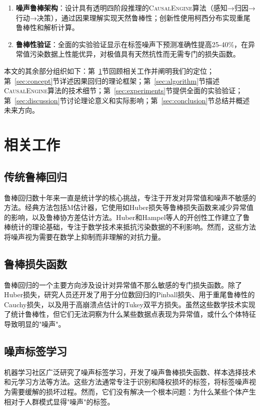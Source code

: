 \documentclass[conference]{IEEEtran}
\newcommand{\causalengine}{\textsc{CausalEngine}}
\begin{document}
\begin{CJK}{UTF8}{gbsn}
\begin{enumerate}
\item \textbf{噪声鲁棒架构}：设计具有透明四阶段推理的\causalengine{}算法（感知→归因→行动→决策），通过因果理解实现天然鲁棒性；创新性使用柯西分布实现重尾鲁棒性和解析计算。

\item \textbf{鲁棒性验证}：全面的实验验证显示在标签噪声下预测准确性提高25-40\%，在异常值污染数据上性能优异，对极值具有天然抗性而无需专门的损失函数。
\end{enumerate}

本文的其余部分组织如下：第~\ref{sec:related}节回顾相关工作并阐明我们的定位；第~\ref{sec:concept}节详述因果回归的理论框架；第~\ref{sec:algorithm}节描述\causalengine{}算法的技术细节；第~\ref{sec:experiments}节提供全面的实验验证；第~\ref{sec:discussion}节讨论理论意义和实际影响；第~\ref{sec:conclusion}节总结并概述未来方向。

\section{相关工作}
\label{sec:related}

\subsection{传统鲁棒回归}
鲁棒回归数十年来一直是统计学的核心挑战，专注于开发对异常值和噪声不敏感的方法。经典方法包括M估计器\cite{huber1964robust}，它使用如Huber损失等鲁棒损失函数来减少异常值的影响，以及鲁棒协方差估计方法\cite{rousseeuw1987robust}。Huber\cite{huber2009robust}和Hampel等人\cite{hampel1986robust}的开创性工作建立了鲁棒统计的理论基础，专注于数学技术来抵抗污染数据的不利影响。然而，这些方法将噪声视为需要在数学上抑制而非理解的对抗力量。

\subsection{鲁棒损失函数}
鲁棒回归的一个主要方向涉及设计对异常值不那么敏感的专门损失函数。除了Huber损失，研究人员还开发了用于分位数回归的Pinball损失\cite{koenker1978regression}、用于重尾鲁棒性的Cauchy损失，以及用于高崩溃点估计的Tukey双平方损失\cite{maronna2019robust}。虽然这些数学技术实现了统计鲁棒性，但它们无法洞察为什么某些数据点表现为异常值，或什么个体特征导致明显的"噪声"。

\subsection{噪声标签学习}
机器学习社区广泛研究了噪声标签学习\cite{natarajan2013learning}，开发了噪声鲁棒损失函数、样本选择技术和元学习方法等方法\cite{han2018co}。这些方法通常专注于识别和降权损坏的标签，将标签噪声视为需要缓解的损坏过程。然而，它们没有解决一个根本问题：为什么某些个体产生相对于人群模式显得"噪声"的标签。


\end{CJK}
\end{document}
